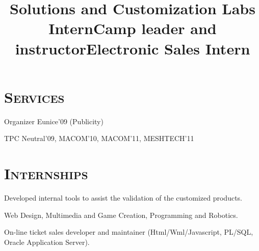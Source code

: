 \documentclass[line,margin]{res}
\begin{document}
\begin{resume}
\section{\textsc{Services}}
Organizer
\hfill {Eunice'09 (Publicity)}

TPC
\hfill {Neutral'09, MACOM'10, MACOM'11, MESHTECH'11}

%

\section{\textsc{Internships}}

\title{Solutions and Customization Labs Intern}
\begin{position}
Developed internal tools to assist the validation of the customized products.
\end{position}

\title{Camp leader and instructor}
\begin{position}
Web Design, Multimedia and Game Creation, Programming and Robotics.
\end{position}

\title{Electronic Sales Intern}
\begin{position}
On-line ticket sales developer and maintainer (Html/Wml/Javascript, PL/SQL, Oracle Application Server).
\end{position}


\end{resume}
\end{document}
